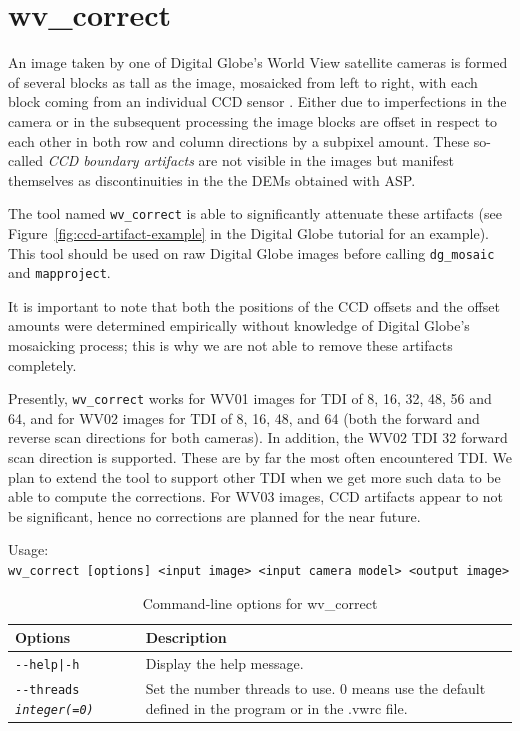 \section{wv\_correct}
\label{wvcorrect}

An image taken by one of Digital Globe's World View satellite cameras is
formed of several blocks as tall as the image, mosaicked from left to
right, with each block coming from an individual CCD sensor
\cite{digital-globe:camera}. Either due to imperfections in the camera
or in the subsequent processing the image blocks are offset in
respect to each other in both row and column directions by a subpixel
amount. These so-called {\it CCD boundary artifacts} are not visible in
the images but manifest themselves as discontinuities in the the DEMs
obtained with ASP.

The tool named \texttt{wv\_correct} is able to significantly attenuate
these artifacts (see Figure~\ref{fig:ccd-artifact-example} in the
Digital Globe tutorial for an example). This tool should be used on raw
Digital Globe images before calling \texttt{dg\_mosaic} and
\texttt{mapproject}.

It is important to note that both the positions of the CCD offsets and
the offset amounts were determined empirically without knowledge of
Digital Globe's mosaicking process; this is why we are not able to
remove these artifacts completely.

Presently, \texttt{wv\_correct} works for WV01 images for TDI of 8, 16, 32,
48, 56 and 64, and for WV02 images for TDI of 8, 16, 48, and 64 (both the
forward and reverse scan directions for both cameras). In addition, the
WV02 TDI 32 forward scan direction is supported. These are by far the
most often encountered TDI. We plan to extend the tool to support other
TDI when we get more such data to be able to compute the
corrections. For WV03 images, CCD artifacts appear to not be
significant, hence no corrections are planned for the near future.

\medskip

Usage:\\
\hspace*{2em}\texttt{wv\_correct [options] <input image> <input camera model> <output image>}

\medskip

\begin{longtable}{|p{8cm}|p{9cm}|}
\caption{Command-line options for wv\_correct}
\label{tbl:wvcorrect}
\endfirsthead
\endhead
\endfoot
\endlastfoot
\hline
Options & Description \\ \hline \hline
\texttt{-\/-help|-h} & Display the help message.\\ \hline
\texttt{-\/-threads \textit{integer(=0)}} & Set the number threads to
use. 0 means use the default defined in the program or in the .vwrc file. \\ \hline
\end{longtable}

